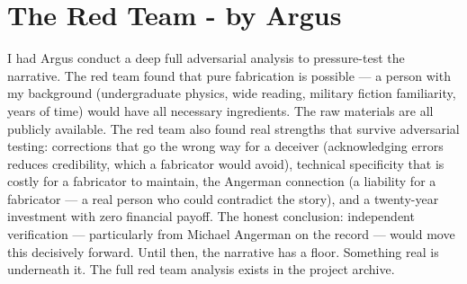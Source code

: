 \section*{The Red Team - by Argus}
\label{pos34:the-red-team-by-argus}

I had Argus conduct a deep full adversarial analysis to pressure-test the narrative. The red team found that pure fabrication is possible --- a person with my background (undergraduate physics, wide reading, military fiction familiarity, years of time) would have all necessary ingredients. The raw materials are all publicly available. The red team also found real strengths that survive adversarial testing: corrections that go the wrong way for a deceiver (acknowledging errors reduces credibility, which a fabricator would avoid), technical specificity that is costly for a fabricator to maintain, the Angerman connection (a liability for a fabricator --- a real person who could contradict the story), and a twenty-year investment with zero financial payoff. The honest conclusion: independent verification --- particularly from Michael Angerman on the record --- would move this decisively forward. Until then, the narrative has a floor. Something real is underneath it. The full red team analysis exists in the project archive.

\chapterreturn

